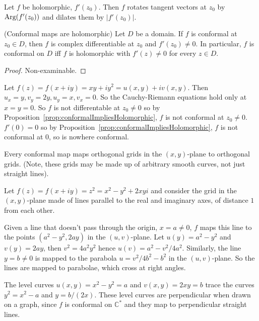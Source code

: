 \begin{corollary}
	Let $f$ be holomorphic, $f'(z_0)$. Then $f$ rotates tangent vectors at $z_0$ by $\text{Arg}(f'(z_0))$ and dilates them by $|f'(z_0)|$.
\end{corollary}

\begin{proposition}\label{prop:conformalImpliesHolomorphic}
	({Conformal maps are holomorphic}) Let $D$ be a domain. If $f$ is conformal at $z_0 \in D$, then $f$ is complex differentiable at $z_0$ and $f'(z_0) \ne 0$. In particular, $f$ is conformal on $D$ iff $f$ is holomorphic with $f'(z) \ne 0$ for every $z \in D$.
\end{proposition}

\begin{proof}
	Non-examinable.
\end{proof}

\begin{example}
	Let $f(z) = f(x + iy) = xy + iy^2 = u(x, y) + i v(x, y)$. Then $u_x = y, v_y = 2y, u_y = x, v_x = 0$. So the Cauchy-Riemann equations hold only at $x = y = 0$. So $f$ is not differentable at $z_0 \ne 0$ so by Proposition~\ref{prop:conformalImpliesHolomorphic}, $f$ is not conformal at $z_0 \ne 0$. $f'(0) = 0$ so by Proposition~\ref{prop:conformalImpliesHolomorphic}, $f$ is not conformal at $0$, so is nowhere conformal.
\end{example}

\begin{corollary}
	Every conformal map maps orthogonal grids in the $(x, y)$-plane to orthogonal grids. (Note, these grids may be made up of arbitrary smooth curves, not just straight lines).
\end{corollary}

\begin{example}
	Let $f(z) = f(x + iy) = z^2 = x^2 - y^2 + 2xy i$ and consider the grid in the $(x, y)$-plane made of lines parallel to the real and imaginary axes, of distance $1$ from each other.

	Given a line that doesn't pass through the origin, $x = a \ne 0$, $f$ maps this line to the points $(a^2 - y^2, 2ay)$ in the $(u, v)$-plane. Let $u(y) = a^2 - y^2$ and $v(y) = 2ay$, then $v^2 = 4a^2 y^2$ hence $u(v) = a^2 - v^2/4a^2$. Similarly, the line $y = b \ne 0$ is mapped to the parabola $u = v^2 / 4b^2 - b^2$ in the $(u, v)$-plane. So the lines are mapped to parabolae, which cross at right angles.

	The level curves $u(x, y) = x^2 - y^2 = a$ and $v(x, y) = 2xy = b$ trace the curves $y^2 = x^2 - a$ and $y = b/(2x)$. These level curves are perpendicular when drawn on a graph, since $f$ is conformal on $\mathbb{C}^*$ and they map to perpendicular straight lines.
\end{example}

